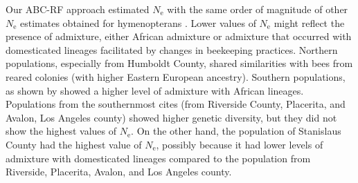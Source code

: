 \documentclass[a4paper, 12pt]{article}
\begin{document}

Our ABC-RF approach estimated $N_\mathrm{e}$ with the same order of magnitude of other $N_\mathrm{e}$ estimates obtained for hymenopterans \citep{Zayed:2004kg}.
Lower values of $N_\mathrm{e}$ might reflect the presence of admixture, either African admixture or admixture that occurred with domesticated lineages facilitated by changes in beekeeping practices. Northern populations, especially from Humboldt County, shared similarities with bees from reared colonies (with higher Eastern European ancestry). Southern populations, as shown by \citet{Cridland:2018fx} showed a higher level of admixture with African lineages. Populations from the southernmost cites (from Riverside County, Placerita, and Avalon, Los Angeles county) showed higher genetic diversity, but they did not show the highest values of $N_\mathrm{e}$. On the other hand, the population of Stanislaus County had the highest value of $N_\mathrm{e}$, possibly because it had lower levels of admixture with domesticated lineages compared to the population from  Riverside, Placerita, Avalon, and Los Angeles county.
 
\end{document}
